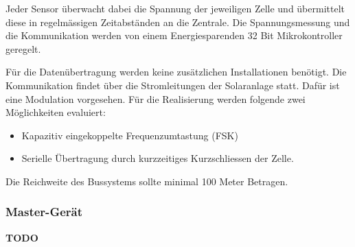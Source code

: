 Jeder  Sensor  \"uberwacht  dabei  die   Spannung  der  jeweiligen  Zelle  und
\"ubermittelt diese  in regelm\"assigen  Zeitabst\"anden an  die Zentrale. Die
Spannungsmessung und  die Kommunikation  werden von einem  Energiesparenden 32
Bit Mikrokontroller geregelt.

F\"ur  die  Daten\"ubertragung   werden  keine  zus\"atzlichen  Installationen
ben\"otigt. Die Kommunikation findet \"uber die Stromleitungen der Solaranlage
statt. Daf\"ur ist  eine Modulation vorgesehen. F\"ur die  Realisierung werden
folgende zwei M\"oglichkeiten evaluiert:

\begin{itemize}
    \item
        Kapazitiv eingekoppelte Frequenzumtastung (FSK)
    \item
        Serielle \"Ubertragung durch kurzzeitiges Kurzschliessen der Zelle.
\end{itemize}

Die Reichweite des Bussystems sollte minimal 100 Meter Betragen.


\subsubsection{Master-Ger\"at}

\textbf{TODO}
